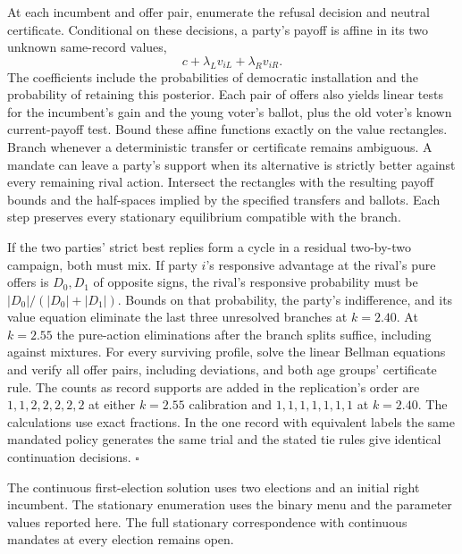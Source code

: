 \documentclass[11pt,letterpaper]{article}
\begin{document}
At each incumbent and offer pair, enumerate the refusal decision and neutral certificate. Conditional on these decisions, a party's payoff is affine in its two unknown same-record values,
\[
                         c+\lambda_L v_{iL}+\lambda_R v_{iR}.
\]
The coefficients include the probabilities of democratic installation and the probability of retaining this posterior. Each pair of offers also yields linear tests for the incumbent's gain and the young voter's ballot, plus the old voter's known current-payoff test. Bound these affine functions exactly on the value rectangles. Branch whenever a deterministic transfer or certificate remains ambiguous. A mandate can leave a party's support when its alternative is strictly better against every remaining rival action. Intersect the rectangles with the resulting payoff bounds and the half-spaces implied by the specified transfers and ballots. Each step preserves every stationary equilibrium compatible with the branch.

If the two parties' strict best replies form a cycle in a residual two-by-two campaign, both must mix. If party $i$'s responsive advantage at the rival's pure offers is $D_0,D_1$ of opposite signs, the rival's responsive probability must be $|D_0|/(|D_0|+|D_1|)$. Bounds on that probability, the party's indifference, and its value equation eliminate the last three unresolved branches at $k=2.40$. At $k=2.55$ the pure-action eliminations after the branch splits suffice, including against mixtures. For every surviving profile, solve the linear Bellman equations and verify all offer pairs, including deviations, and both age groups' certificate rule. The counts as record supports are added in the replication's order are $1,1,2,2,2,2,2$ at either $k=2.55$ calibration and $1,1,1,1,1,1,1$ at $k=2.40$. The calculations use exact fractions. In the one record with equivalent labels the same mandated policy generates the same trial and the stated tie rules give identical continuation decisions. \hfill$\square$

The continuous first-election solution uses two elections and an initial right incumbent. The stationary enumeration uses the binary menu and the parameter values reported here. The full stationary correspondence with continuous mandates at every election remains open.
\end{document}
